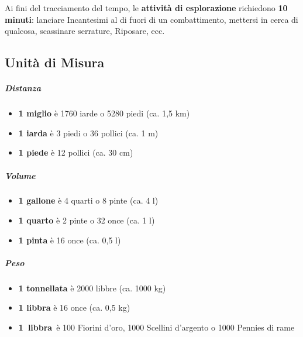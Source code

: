 \documentclass[itdr]{subfiles}
\begin{document}
Ai fini del tracciamento del tempo, le \textbf{attività di esplorazione} richiedono \textbf{10 minuti}: lanciare Incantesimi al di fuori di un combattimento, mettersi in cerca di qualcosa, scassinare serrature, Riposare, ecc.

\vfill

\begin{dbox}
	\subsection*{Unità di Misura}
	
	\subparagraph{Distanza}
	\begin{itemize}
		\item \textbf{1 miglio} è 1760 iarde o 5280 piedi (ca. 1,5 km)
		\item \textbf{1 iarda} è 3 piedi o 36 pollici (ca. 1 m)
		\item \textbf{1 piede} è 12 pollici (ca. 30 cm)
	\end{itemize}

	\subparagraph{Volume}
	\begin{itemize}
		\item \textbf{1 gallone} è 4 quarti o 8 pinte (ca. 4 l)
		\item \textbf{1 quarto} è 2 pinte o 32 once (ca. 1 l)
		\item \textbf{1 pinta} è 16 once (ca. 0,5 l)
	\end{itemize}
	
	\subparagraph{Peso}
	\begin{itemize}
		\item \textbf{1 tonnellata} è 2000 libbre (ca. 1000 kg)
		\item \textbf{1 libbra} è 16 once (ca. 0,5 kg)
		\item \mbox{\textbf{1 libbra} è} 100 Fiorini d'oro, 1000 Scellini d'argento o 1000 Pennies di rame
	\end{itemize}
\end{dbox}

\break
\end{document}
